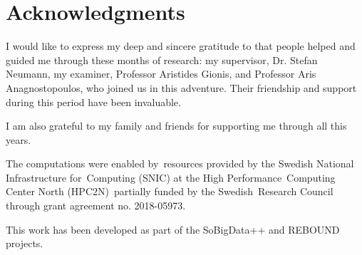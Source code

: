 \section*{Acknowledgments }

I would like to express my deep and sincere gratitude to that people helped and
guided me through these months of research: my supervisor, Dr. Stefan Neumann,
my examiner, Professor
Aristides Gionis, and Professor Aris Anagnostopoulos, who joined
us in this adventure. Their friendship and support during this period have been
invaluable.

I am also grateful to my family and friends for supporting me through
all this years.

\bigskip
The computations were enabled by resources provided by the Swedish National Infrastructure for Computing
(SNIC) at the High Performance Computing Center North (HPC2N) partially funded by the Swedish Research Council through grant agreement no. 2018-05973.

This work has been developed as part of the SoBigData++ and REBOUND projects.
\acknowlegmentssignature
